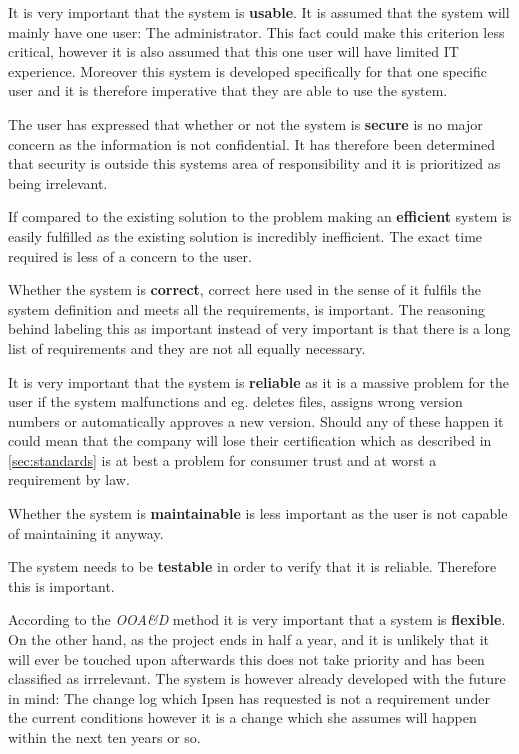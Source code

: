 It is very important that the system is \textbf{usable}. It is assumed that the system will mainly have one user: The administrator. This fact could make this criterion less critical, however it is also assumed that this one user will have limited IT experience. Moreover this system is developed specifically for that one specific user and it is therefore imperative that they are able to use the system.

The user has expressed that whether or not the system is \textbf{secure} is no major concern as the information is not confidential. It has therefore been determined that security is outside this systems area of responsibility and it is prioritized as being irrelevant.

If compared to the existing solution to the problem making an \textbf{efficient} system is easily fulfilled as the existing solution is incredibly inefficient. The exact time required is less of a concern to the user.

Whether the system is \textbf{correct}, correct here used in the sense of it fulfils the system definition and meets all the requirements, is important. The reasoning behind labeling this as important instead of very important is that there is a long list of requirements and they are not all equally necessary.

It is very important that the system is \textbf{reliable} as it is a massive problem for the user if the system malfunctions and eg. deletes files, assigns wrong version numbers or automatically approves a new version. Should any of these happen it could mean that the company will lose their certification which as described in \cref{sec:standards} is at best a problem for consumer trust and at worst a requirement by law.

Whether the system is \textbf{maintainable} is less important as the user is not capable of maintaining it anyway.

The system needs to be \textbf{testable} in order to verify that it is reliable. Therefore this is important.

According to the \textit{OOA\&D} method it is very important that a system is \textbf{flexible}. On the other hand, as the project ends in half a year, and it is unlikely that it will ever be touched upon afterwards this does not take priority and has been classified as irrrelevant. The system is however already developed with the future in mind: The change log which Ipsen has requested is not a requirement under the current conditions however it is a change which she assumes will happen within the next ten years or so.

